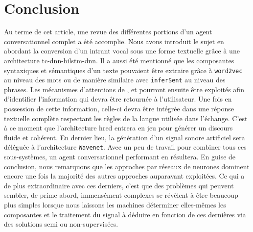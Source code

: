 \section*{Conclusion}
Au terme de cet article, une revue des différentes portions d'un agent conversationnel complet a été accomplie. Nous avons introduit le sujet en abordant la conversion d'un intrant vocal sous une forme textuelle grâce à une architecture \gls{tc}-\gls{dnn}-\gls{bilstm}-\gls{dnn}. Il a aussi été mentionné que les composantes syntaxiques et sémantiques d'un texte pouvaient être extraire grâce à \texttt{word2vec} au niveau des mots ou de manière similaire avec \texttt{inferSent} au niveau des phrases. Les mécanismes d'attentions de \cite{attentionBasedApproaches}, \cite{attentionIsAllYouNeed} et \cite{attentionMechanism} pourront ensuite être exploités afin d’identifier l'information qui devra être retournée à l'utilisateur. Une fois en possession de cette information, celle-ci devra être intégrée dans une réponse textuelle complète respectant les règles de la langue utilisée dans l'échange. C'est à ce moment que l'architecture \gls{hred} entrera en jeu pour générer un discours fluide et cohérent. En dernier lieu, la génération d'un signal sonore artificiel sera déléguée à l'architecture \texttt{Wavenet}. Avec un peu de travail pour combiner tous ces sous-systèmes, un agent conversationnel performant en résultera. En guise de conclusion, nous remarquons que les approches par réseaux de neurones dominent encore une fois la majorité des autres approches auparavant exploitées. Ce qui a de plus extraordinaire avec ces derniers, c'est que des problèmes qui peuvent sembler, de prime abord, immensément complexes se révèlent à être beaucoup plus simples lorsque nous laissons les machines déterminer elles-mêmes les composantes et le traitement du signal à déduire en fonction de ces dernières via des solutions semi ou non-supervisées.
